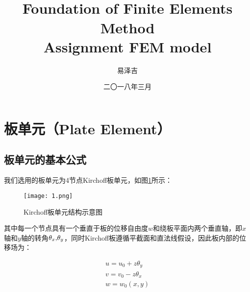 \documentclass[forprint]{WHUBachelor}
\begin{document}



\title{\\Foundation of Finite Elements Method\\Assignment FEM model}

\author{易泽吉}                            %



\date{二〇一八年三月}                    %


\maketitle
\frontmatter
{}              %

\mainmatter %
\section{板单元（Plate Element）}

\subsection{板单元的基本公式}

我们选用的板单元为4节点Kirchoff板单元，如图\ref{f1}所示：

\begin{figure}[H]
\centering  
\texttt{[image: 1.png]} 
\caption{Kirchoff板单元结构示意图} 
\label{f1} 
\end{figure}

其中每一个节点具有一个垂直于板的位移自由度$w$和绕板平面内两个垂直轴，即$x$轴和$y$轴的转角$\text{\ensuremath{\theta_{x}},\ensuremath{\theta_{y}}}$，同时Kirchoff板遵循平截面和直法线假设，因此板内部的位移场为：

\begin{equation}
\begin{array}{l}
{u=u_{0}+z\theta_{y}}\\
{v=v_{0}-z\theta_{x}}\\
{w=w_{0}(x,y)}
\end{array}\label{eq1}
\end{equation}
\end{document}
